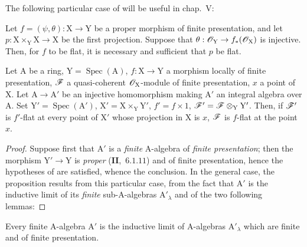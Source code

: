 The following particular case of  will be useful in chap.~V:

\begin{corollary}[11.5.4]
\label{IV.11.5.4}
Let $f=(\psi,\theta):\mathrm{X}\to\mathrm{Y}$ be a \textup{proper} morphism of finite presentation,
and let $p:\mathrm{X}\times_\mathrm{Y}\mathrm{X}\to\mathrm{X}$ be the first projection. Suppose that $\theta:\mathscr{O}_\mathrm{Y}\to f_*(\mathscr{O}_\mathrm{X})$ is injective.
Then, for $f$ to be flat, it is necessary and sufficient that $p$ be flat.
\end{corollary}

\begin{proposition}[11.5.5]
\label{IV.11.5.5}
Let $\mathrm{A}$ be a ring, $\mathrm{Y}=\operatorname{Spec}(\mathrm{A})$, $f:\mathrm{X}\to\mathrm{Y}$ a morphism
locally of finite presentation, $\mathscr{F}$ a quasi-coherent $\mathscr{O}_\mathrm{X}$-module of finite presentation, $x$ a point
of $\mathrm{X}$. Let $\mathrm{A}\to\mathrm{A}'$ be an injective homomorphism making $\mathrm{A}'$ an \textup{integral} algebra over $\mathrm{A}$. Set
$\mathrm{Y}'=\operatorname{Spec}(\mathrm{A}')$, $\mathrm{X}'=\mathrm{X}\times_\mathrm{Y}\mathrm{Y}'$, $f'=f\times 1$, $\mathscr{F}'=\mathscr{F}\otimes_\mathrm{Y}\mathrm{Y}'$. Then, if $\mathscr{F}'$ is $f'$-flat at \textup{every} point
of $\mathrm{X}'$ whose projection in $\mathrm{X}$ is $x$, $\mathscr{F}$ is $f$-flat at the point $x$.
\end{proposition}

\begin{proof}
Suppose first that $\mathrm{A}'$ is a \emph{finite} $\mathrm{A}$-algebra of \emph{finite presentation}; then the
morphism $\mathrm{Y}'\to\mathrm{Y}$ is \emph{proper} (\textbf{II},~$6.1.11$) and of finite presentation, hence the hypotheses
of  are satisfied, whence the conclusion. In the general case, the proposition results
from this particular case, from the fact that $\mathrm{A}'$ is the inductive limit of its \emph{finite} sub-$\mathrm{A}$-algebras
$\mathrm{A}'_\lambda$ and of the two following lemmas:
\end{proof}

\begin{lemma}[11.5.5.1]
\label{IV.11.5.5.1}
Every finite $\mathrm{A}$-algebra $\mathrm{A}'$ is the inductive limit of $\mathrm{A}$-algebras $\mathrm{A}'_\lambda$
which are finite and of finite presentation.
\end{lemma}

